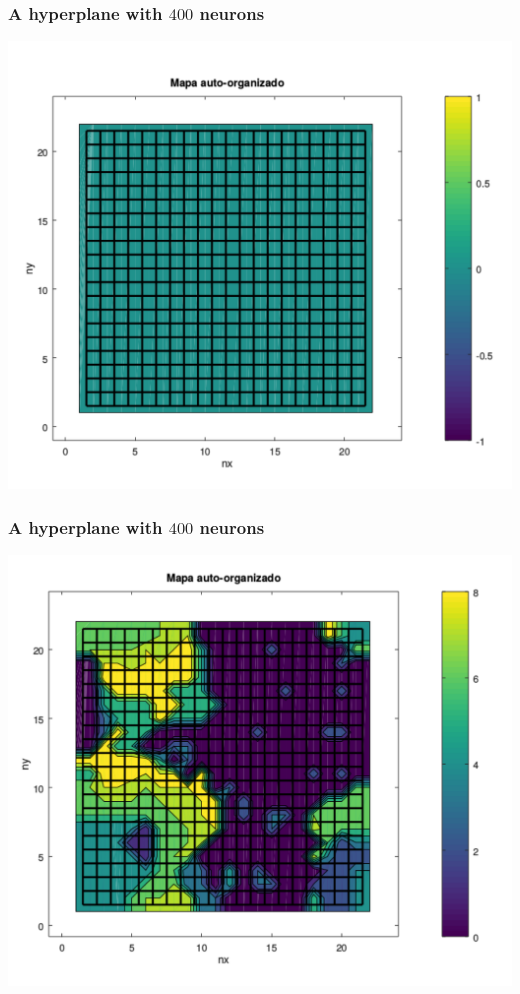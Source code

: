\documentclass[aspectratio=10]{beamer} %
\begin{document}
\begin{frame}
\frametitle{A hyperplane with $400$ neurons}
\centering
\includegraphics[scale=0.47]{Imagens/SOM1_2d.pdf} 
\end{frame}

\begin{frame}
\frametitle{A hyperplane with $400$ neurons}
\centering
\includegraphics[scale=0.47]{Imagens/SOM5_2d.pdf} 
\end{frame}
\end{document}

